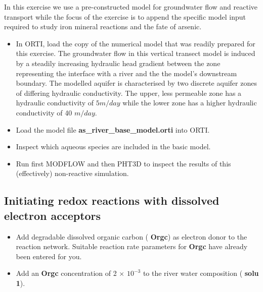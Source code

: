 In this exercise we use a pre-constructed model for groundwater flow and reactive transport 
while the focus of the exercise is to append the specific model input required to
study iron mineral reactions and the fate of arsenic.

\begin{itemize}

\item In ORTI, load the copy of the numerical model that was readily prepared 
for this exercise. 
The groundwater flow in this vertical transect model is induced 
by a steadily increasing hydraulic head gradient between the zone representing the interface with a river and the 
the model's downstream boundary. The modelled aquifer is characterised by two discrete
aquifer zones of differing hydraulic conductivity. 
The upper, less permeable zone has a hydraulic conductivity of $5 m/day$ while the lower zone has a higher 
hydraulic conductivity of 40 $m/day$. 

\item Load the model file {\color{red} \textbf{as\_river\_base\_model.orti}} into ORTI. 

\item Inspect which aqueous species are included in the basic model. 

\item Run first MODFLOW and then PHT3D to inspect the results of this (effectively) non-reactive simulation. 

\end{itemize}

\subsection[Initiating redox reactions with dissolved electron acceptors]{Initiating redox reactions with dissolved electron acceptors} 

\begin{itemize}

\item Add degradable dissolved organic carbon ({\color{red} \textbf{Orgc}}) as electron donor to the reaction network. Suitable reaction rate parameters for {\color{red} \textbf{Orgc}} have already been entered for you.

\item Add an {\color{red} \textbf{Orgc}} concentration of 2 $\times$ $10^{-3}$ to 
the river water composition ({\color{red} \textbf{solu 1}}).   

\end{itemize}

